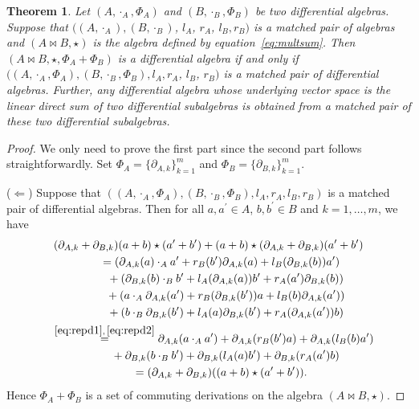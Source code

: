 \documentclass[pdftex]{sigma}
\numberwithin{equation}{section}
\newtheorem{Theorem}{Theorem}[section]
\begin{document}
\begin{Theorem}\label{thm:matda}
 Let $(A, \cdot_A, \Phi_A)$ and $(B, \cdot_B, \Phi_B)$ be two differential algebras.
 Suppose that $((A, \cdot_A), (B, \cdot_B)$, $l_A$, $r_A$, $l_B, r_B)$ is a matched pair of algebras and
 $(A \bowtie B, \star)$ is the algebra defined by equation~\eqref{eq:multsum}.
 Then $(A \bowtie B, \star, \Phi_A + \Phi_B)$ is a differential algebra if and only if
 $((A, \cdot_A, \Phi_A), (B, \cdot_B, \Phi_B), l_A, r_A$, $l_B$, $r_B)$ is a matched pair of differential algebras.
 Further, any differential algebra whose underlying vector space is the linear direct sum of two differential subalgebras is obtained from a matched pair of these two differential subalgebras.
\end{Theorem}
\begin{proof}
 We only need to prove the first part since the second part follows straightforwardly. Set $\Phi_A = \{\partial_{A,k}\}_{k=1}^m$ and $\Phi_B = \{\partial_{B,k}\}_{k=1}^m$.

 ($\Longleftarrow$)
 Suppose that $((A, \cdot_A, \Phi_A), (B, \cdot_B, \Phi_B), l_A, r_A, l_B, r_B)$ is a matched pair of differential algebras.
 Then for all $a, a^\prime \in A$, $b, b^\prime \in B$ and $k=1,\dots, m$, we have
 \begin{gather*}
(\partial_{A,k} + \partial_{B,k})(a + b) \star (a^\prime + b^\prime) + (a + b) \star (\partial_{A,k} + \partial_{B,k})(a^\prime + b^\prime) \\
 \qquad{} = (\partial_{A,k}(a) \cdot_A a^\prime + r_B(b^\prime)\partial_{A,k}(a) + l_B(\partial_{B,k}(b))a^\prime) \\
 \qquad \quad{}+ (\partial_{B,k}(b) \cdot_B b^\prime + l_A(\partial_{A,k}(a))b^\prime + r_A(a^\prime)\partial_{B,k}(b)) \\
 \qquad \quad{} + (a \cdot_A \partial_{A,k}(a^\prime) + r_B(\partial_{B,k}(b^\prime))a + l_B(b)\partial_{A,k}(a^\prime)) \\
 \qquad \quad{} + (b \cdot_B \partial_{B,k}(b^\prime) + l_A(a)\partial_{B,k}(b^\prime) + r_A(\partial_{A,k}(a^\prime))b) \\
\quad \overset{\eqref{eq:repd1}, \, \eqref{eq:repd2}}{=} \partial_{A,k}(a \cdot_A a^\prime) + \partial_{A,k}(r_B(b^\prime)a) + \partial_{A,k}(l_B(b)a^\prime) \\
 \qquad\quad{} + \partial_{B,k}(b \cdot_B b^\prime) + \partial_{B,k}(l_A(a)b^\prime) + \partial_{B,k}(r_A(a^\prime)b) \\
 \qquad {} = (\partial_{A,k}+\partial_{B,k})((a + b) \star (a^\prime + b^\prime)).
\end{gather*}
 Hence $\Phi_A + \Phi_B$ is a set of commuting derivations on the algebra $(A \bowtie B, \star)$.


\end{proof}
\end{document}

